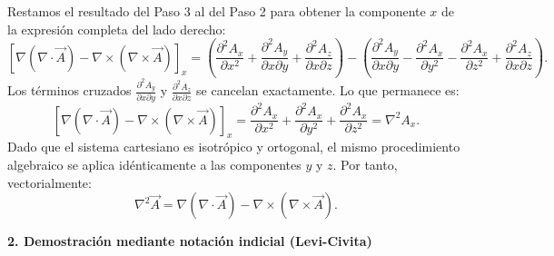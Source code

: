 \documentclass[a4paper]{article}
\begin{document}
Restamos el resultado del Paso 3 al del Paso 2 para obtener la componente $x$ de la expresión completa del lado derecho:
$$
[\nabla(\nabla \cdot \vec{A}) - \nabla \times (\nabla \times \vec{A})]_x = \left( \frac{\partial^2 A_x}{\partial x^2} + \frac{\partial^2 A_y}{\partial x \partial y} + \frac{\partial^2 A_z}{\partial x \partial z} \right) - \left( \frac{\partial^2 A_y}{\partial x \partial y} - \frac{\partial^2 A_x}{\partial y^2} - \frac{\partial^2 A_x}{\partial z^2} + \frac{\partial^2 A_z}{\partial x \partial z} \right).
$$
Los términos cruzados $\frac{\partial^2 A_y}{\partial x \partial y}$ y $\frac{\partial^2 A_z}{\partial x \partial z}$ se cancelan exactamente. Lo que permanece es:
$$
[\nabla(\nabla \cdot \vec{A}) - \nabla \times (\nabla \times \vec{A})]_x = \frac{\partial^2 A_x}{\partial x^2} + \frac{\partial^2 A_x}{\partial y^2} + \frac{\partial^2 A_x}{\partial z^2} = \nabla^2 A_x.
$$
Dado que el sistema cartesiano es isotrópico y ortogonal, el mismo procedimiento algebraico se aplica idénticamente a las componentes $y$ y $z$. Por tanto, vectorialmente:
$$
\nabla^2 \vec{A} = \nabla(\nabla \cdot \vec{A}) - \nabla \times (\nabla \times \vec{A}).
$$

\vspace{0.3cm}
\noindent\textbf{2. Demostración mediante notación indicial (Levi-Civita)}
\end{document}
